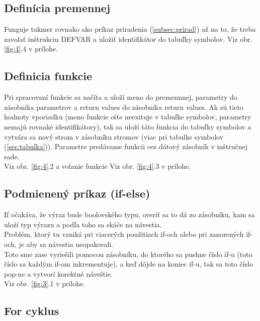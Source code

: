 \documentclass[a4paper,11pt]{article}
\begin{document}
		\subsection{Definícia premennej}\label{subsec:defprem}

		Funguje takmer rovnako ako príkaz priradenia (\ref{subsec:prirad}) až na to, že treba zavolať inštrukciu DEFVAR a uložiť identifikátor do tabuľky symbolov. Viz obr. \ref{fig:4}.4 v prílohe.
	
		\subsection{Definicia funkcie}\label{subsec:deffun}

		Pri spracovaní funkcie sa načíta a uloží meno do premennnej, parametry do zásobníka parametrov a return values do zásobníka return values. Ak sú tieto hodnoty vporiadku (meno funkcie ešte neexituje v tabuľke symbolov, parametry nemajú rovnaké identifikátory), tak sa uloží táto funkcia do tabuľky symbolov a vytvára sa nový strom v zásobníku stromov (viac pri tabulke symbolov (\ref{sec:tabulka})). Parametre predávame funkcii cez dátový zásobník v inštručnej sade.\\
		Viz obr. \ref{fig:4}.2 a volanie funkcie Viz obr. \ref{fig:4}.3 v prílohe.

		\subsection{Podmienený príkaz (if-else)}\label{subsec:ifelse}
		
		If očakáva, že výraz bude boolovského typu, overiť sa to dá zo zásobníku, kam sa uloží typ výrazu a podľa toho sa skáče na návestia.\\
		
		\noindent Problém, ktorý tu vzniká pri viacerých použitiach if-och alebo pri zanorených if-och, je aby sa návestia neopakovali.\\ Toto sme zase vyriešili pomocou zásobníku, do ktorého sa pushne číslo if-u (toto číslo sa každým if-om inkrementuje), a keď dôjde na koniec if-u, tak sa toto číslo pop-ne a vytvorí korektné náveštie.\\
		Viz obr. \ref{fig:3}.1 v prílohe.

		\subsection{For cyklus}\label{subsec:for}
		
\end{document}
